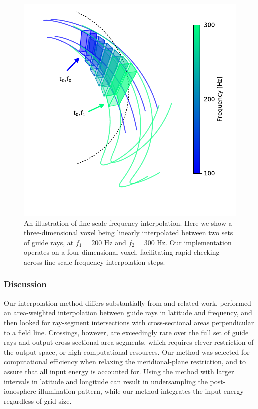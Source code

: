 \begin{figure}
\begin{center}
\includegraphics{figures/delaunay_2.pdf}
\caption[Fine-scale frequency interpolation]{An illustration of fine-scale frequency interpolation. Here we show a three-dimensional voxel being linearly interpolated between two sets of guide rays, at $f_1=200$ Hz and $f_2=300$ Hz. Our implementation operates on a four-dimensional voxel, facilitating rapid checking across fine-scale frequency interpolation steps.}
\label{fig:delaunay_2}
\end{center}
\end{figure}

\subsubsection{Discussion}
Our interpolation method differs substantially from \cite{Bortnik2005} and related work. \citeauthor{Bortnik2005} performed an area-weighted interpolation between guide rays in latitude and frequency, and then looked for ray-segment intersections with cross-sectional areas perpendicular to a field line. Crossings, however, are exceedingly rare over the full set of guide rays and output cross-sectional area segments, which requires clever restriction of the output space, or high computational resources. Our method was selected for computational efficiency when relaxing the meridional-plane restriction, and to assure that all input energy is accounted for. Using the \cite{Bortnik2005} method with larger intervals in latitude and longitude can result in undersampling the post-ionosphere illumination pattern, while our method integrates the input energy regardless of grid size.

